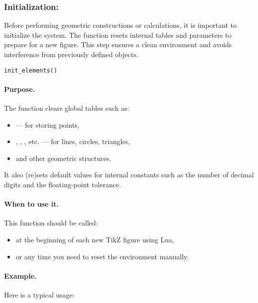 \subsubsection{Initialization: }

Before performing geometric constructions or calculations, it is important to initialize the system. The function  resets internal tables and parameters to prepare for a new figure. This step ensures a clean environment and avoids interference from previously defined objects.

\begin{mybox}
\begin{verbatim}
init_elements()
\end{verbatim}
\end{mybox}

\paragraph{Purpose.}
The function  clears global tables such as:
\begin{itemize}
  \item {} — for storing points,
  \item {}, , , etc. — for lines, circles, triangles,
  \item and other geometric structures.
\end{itemize}
It also (re)sets default values for internal constants such as the number of decimal digits and the floating-point tolerance.

\paragraph{When to use it.}
This function should be called:
\begin{itemize}
  \item at the beginning of each new TikZ figure using Lua,
  \item or any time you need to reset the environment manually.
\end{itemize}

\paragraph{Example.}
Here is a typical usage:

\begin{center}
  \begin{tkzexample}
  \end{tkzexample}
\end{center}

